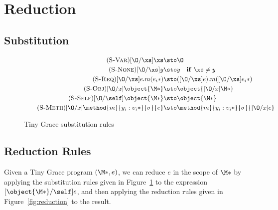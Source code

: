 \section{Reduction}

\subsection{Substitution}

\begin{figure}
\centering

\begin{align}
\tag{\textsc{S-Var}}\label{eq:sub-var}
[\O/\xs]\xs              &\sto \O \\
\tag{\textsc{S-None}}\label{eq:sub-none}
[\O/\xs]y                &\sto y \quad \mathbf{if}\ \xs \neq y \\
\tag{\textsc{S-Req}}\label{eq:sub-req}
[\O/\xs]e.m(\*e_i*)      &\sto ([\O/\xs]e).m(\*[\O/\xs]e_i*) \\
\tag{\textsc{S-Obj}}\label{eq:sub-obj}
[\O/x]\object{\*\M*}     &\sto \object{\*[\O/x]\M*} \\
\tag{\textsc{S-Self}}\label{eq:sub-self}
[\O/\self]\object{\*\M*} &\sto \object{\*\M*} \\
\tag{\textsc{S-Meth}}\label{eq:sub-meth}
[\O/x]\method{m}{\*y_i : \upsilon_i*}{\sigma}{e} &\sto \method{m}{\*y_i : \upsilon_i*}{\sigma}{[\O/x]e}
\end{align}

\caption{Tiny Grace substitution rules}
\label{fig:substitution}

\end{figure}

\subsection{Reduction Rules}

Given a Tiny Grace program $(\*\M*, e)$, we can reduce $e$ in the scope of
$\*\M*$ by applying the substitution rules given in
Figure~\ref{fig:substitution} to the expression $[\object{\*\M*}/\self]e$, and
then applying the reduction rules given in Figure~\ref{fig:reduction} to the
result.

